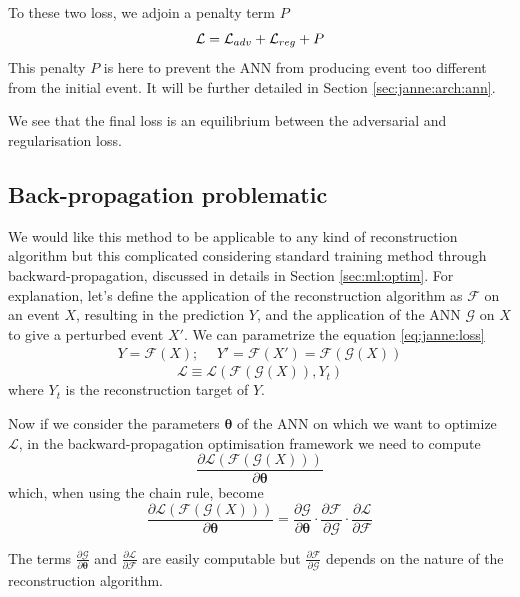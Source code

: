\documentclass[../main.tex]{subfiles}
\begin{document}
To these two loss, we adjoin a penalty term $P$
\begin{equation}
  {\cal L} = {\cal L}_{adv} + {\cal L}_{reg} + P
\end{equation}
This penalty $P$ is here to prevent the ANN from producing event too different from the initial event. It will be further detailed in Section \ref{sec:janne:arch:ann}.

We see that the final loss is an equilibrium between the adversarial and regularisation loss.

\subsection{Back-propagation problematic}
\label{sec:janne:back_prop}

We would like this method to be applicable to any kind of reconstruction algorithm but this complicated considering standard training method through backward-propagation, discussed in details in Section \ref{sec:ml:optim}. For explanation, let's define the application of the reconstruction algorithm as $\mathcal{F}$ on an event $X$, resulting in the prediction $Y$, and the application of the ANN $\mathcal{G}$ on $X$ to give a perturbed event $X'$. We can parametrize the equation \ref{eq:janne:loss}
\begin{align}
  Y = \mathcal{F}(X); ~~& Y' = \mathcal{F}(X') = \mathcal{F}(\mathcal{G}(X))
\end{align}
\begin{equation}
  \mathcal{L} \equiv \mathcal{L}(\mathcal{F}(\mathcal{G}(X)), Y_t)
\end{equation}
where $Y_t$ is the reconstruction target of $Y$.

Now if we consider the parameters $\bm{\theta}$ of the ANN on which we want to optimize $\mathcal{L}$, in the backward-propagation optimisation framework we need to compute
\begin{equation}
  \frac{\partial \mathcal{L}(\mathcal{F}(\mathcal{G}(X)))}{\partial \bm{\theta}}
\end{equation}
which, when using the chain rule, become
\begin{equation}
  \frac{\partial \mathcal{L}(\mathcal{F}(\mathcal{G}(X)))}{\partial \bm{\theta}} = \frac{\partial \mathcal{G}}{\partial \bm{\theta}} \cdot \frac{\partial \mathcal{F}}{\partial \mathcal{G}} \cdot \frac{\partial \mathcal{L}}{\partial \mathcal{F}}
\end{equation}

The terms $\frac{\partial \mathcal{G}}{\partial \bm{\theta}}$ and $\frac{\partial \mathcal{L}}{\partial \mathcal{F}}$ are easily computable but $\frac{\partial \mathcal{F}}{\partial \mathcal{G}}$ depends on the nature of the reconstruction algorithm.
\end{document}
